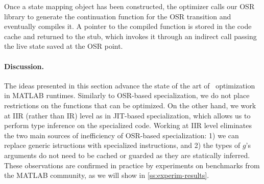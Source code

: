 Once a state mapping object has been constructed, the optimizer calls our OSR library to generate the continuation function for the OSR transition and eventually compiles it. A pointer to the compiled function is stored in the code cache and returned to the stub, which invokes it through an indirect call passing the live state saved at the OSR point.

\paragraph{Discussion.}
The ideas presented in this section advance the state of the art of \feval\ optimization in MATLAB runtimes.
Similarly to OSR-based specialization, we do not place restrictions on the functions that can be optimized. On the other hand, we work at IIR (rather than IR) level as in JIT-based specialization, which allows us to perform type inference on the specialized code. Working at IIR level eliminates the two main sources of inefficiency of OSR-based specialization: 1) we can replace generic istructions with specialized instructions, and 2) the types of $g$'s arguments do not need to be cached or guarded as they are statically inferred. These observations are confirmed in practice by experiments on benchmarks from the MATLAB community, as we will show in \mysection\ref{ss:experim-results}.
